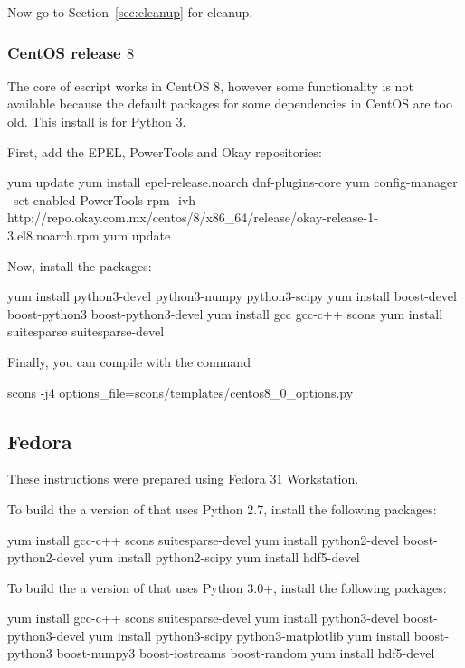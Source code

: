 \documentclass{esysdoc}
\begin{document}
\noindent Now go to Section~\ref{sec:cleanup} for cleanup.

\subsubsection{CentOS release $8$}
The core of escript works in CentOS $8$, however some functionality is not available because the default packages for some dependencies in CentOS are too old. This install is for Python 3.

First, add the EPEL, PowerTools and Okay repositories:
\begin{shellCode}
yum update
yum install epel-release.noarch dnf-plugins-core
yum config-manager --set-enabled PowerTools
rpm -ivh http://repo.okay.com.mx/centos/8/x86_64/release/okay-release-1-3.el8.noarch.rpm
yum update
\end{shellCode}

Now, install the packages:
\begin{shellCode}
yum install python3-devel python3-numpy python3-scipy
yum install boost-devel boost-python3 boost-python3-devel
yum install gcc gcc-c++ scons
yum install suitesparse suitesparse-devel
\end{shellCode}

Finally, you can compile \escript with the command
\begin{shellCode}
scons -j4 options_file=scons/templates/centos8_0_options.py
\end{shellCode}

\subsection{Fedora}\label{sec:fedorasrc}
These instructions were prepared using Fedora $31$ Workstation.

\noindent To build the a version of \escript that uses Python 2.7, install the following packages:
\begin{shellCode}
yum install gcc-c++ scons suitesparse-devel
yum install python2-devel boost-python2-devel
yum install python2-scipy
yum install hdf5-devel
\end{shellCode}

\noindent To build the a version of \escript that uses Python 3.0+, install the following packages:
\begin{shellCode}
yum install gcc-c++ scons suitesparse-devel
yum install python3-devel boost-python3-devel
yum install python3-scipy python3-matplotlib
yum install boost-python3 boost-numpy3 boost-iostreams boost-random
yum install hdf5-devel
\end{shellCode}
\end{document}

